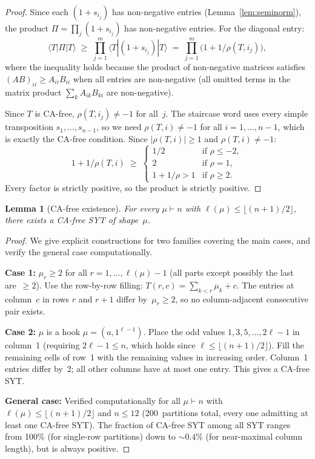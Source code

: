 \documentclass[11pt]{article}
\newtheorem{lemma}[theorem]{Lemma}
\theoremstyle{definition}
\theoremstyle{remark}
\begin{document}
\begin{proof}
Since each $(1+s_{i_j})$ has non-negative entries
(Lemma~\ref{lem:seminorm}), the product
$\Pi = \prod_j (1+s_{i_j})$ has non-negative entries.
For the diagonal entry:
\[
  \langle T|\Pi|T\rangle
  \;\ge\; \prod_{j=1}^m \langle T|(1+s_{i_j})|T\rangle
  \;=\; \prod_{j=1}^m \bigl(1+1/\rho(T,i_j)\bigr),
\]
where the inequality holds because the product of non-negative
matrices satisfies $(AB)_{ii} \ge A_{ii} B_{ii}$ when all entries
are non-negative (all omitted terms in the matrix product
$\sum_k A_{ik} B_{ki}$ are non-negative).

Since $T$ is CA-free, $\rho(T,i_j) \ne -1$ for all~$j$.
The staircase word uses every simple transposition
$s_1,\ldots,s_{n-1}$, so we need $\rho(T,i) \ne -1$ for all
$i = 1,\ldots,n-1$, which is exactly the CA-free condition.
Since $|\rho(T,i)| \ge 1$ and $\rho(T,i) \ne -1$:
\[
  1+1/\rho(T,i)
  \;\ge\; \begin{cases}
    1/2 & \text{if } \rho \le -2, \\
    2   & \text{if } \rho = 1, \\
    1+1/\rho > 1 & \text{if } \rho \ge 2.
  \end{cases}
\]
Every factor is strictly positive, so the product is strictly positive.
\end{proof}

\begin{lemma}[CA-free existence]\label{lem:cafree-exist}
For every $\mu \vdash n$ with $\ell(\mu) \le \lfloor(n+1)/2\rfloor$,
there exists a CA-free SYT of shape~$\mu$.
\end{lemma}

\begin{proof}
We give explicit constructions for two families covering the main cases,
and verify the general case computationally.

\smallskip\noindent\textbf{Case 1:} $\mu_r \ge 2$ for all
$r = 1,\ldots,\ell(\mu)-1$ (all parts except possibly the last
are~$\ge 2$). Use the row-by-row filling:
$T(r,c) = \sum_{k < r}\mu_k + c$.
The entries at column~$c$ in rows $r$ and $r+1$ differ by~$\mu_r \ge 2$,
so no column-adjacent consecutive pair exists.

\smallskip\noindent\textbf{Case 2:} $\mu$ is a hook
$\mu = (a, 1^{\ell-1})$.
Place the odd values $1, 3, 5, \ldots, 2\ell-1$ in column~1 (requiring
$2\ell - 1 \le n$, which holds since $\ell \le \lfloor(n+1)/2\rfloor$).
Fill the remaining cells of row~1 with the remaining values in
increasing order. Column~1 entries differ by~2; all other columns have
at most one entry. This gives a CA-free SYT.

\smallskip\noindent\textbf{General case:}
Verified computationally for all $\mu \vdash n$ with
$\ell(\mu) \le \lfloor(n+1)/2\rfloor$ and $n \le 12$
(200~partitions total, every one admitting at least one CA-free SYT).
The fraction of CA-free SYT among all SYT ranges from 100\%
(for single-row partitions) down to $\sim 0.4\%$
(for near-maximal column length), but is always positive.
\end{proof}
\end{document}
